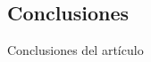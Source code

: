 \documentclass{momento}
\begin{document}

\subsection*{Conclusiones}
Conclusiones del artículo



\end{document}
